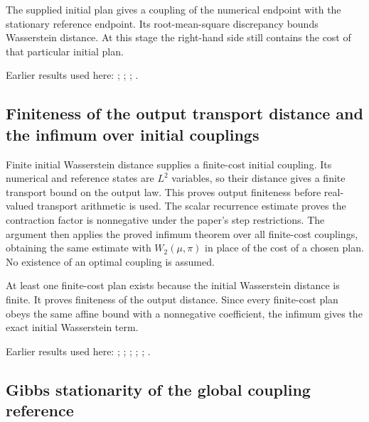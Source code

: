 \documentclass[11pt,a4paper]{report}
\begin{document}
The supplied initial plan gives a coupling of the numerical endpoint with the stationary reference endpoint. Its root-mean-square discrepancy bounds Wasserstein distance. At this stage the right-hand side still contains the cost of that particular initial plan.



Earlier results used here: \cite[Section~3.17.1]{LangevinLean2026ULASC}; \cite[Section~3.17.2]{LangevinLean2026ULASC}; \cite[Section~3.17.4]{LangevinLean2026ULASC}; \cite[Section~3.22.23]{LangevinLean2026ULASC}.
\subsection{\texorpdfstring{Finiteness of the output transport distance and the infimum over initial couplings}{Finiteness of the output transport distance and the infimum over initial couplings}}
\label{report-step-KineticLangevin-GenericCanonicalKLMC-lean-17}


Finite initial Wasserstein distance supplies a finite-cost initial coupling. Its numerical and reference states are \(L^{2}\) variables, so their distance gives a finite transport bound on the output law. This proves output finiteness before real-valued transport arithmetic is used. The scalar recurrence estimate proves the contraction factor is nonnegative under the paper's step restrictions. The argument then applies the proved infimum theorem over all finite-cost couplings, obtaining the same estimate with \(W_2(\mu,\pi)\) in place of the cost of a chosen plan. No existence of an optimal coupling is assumed.



At least one finite-cost plan exists because the initial Wasserstein distance is finite. It proves finiteness of the output distance. Since every finite-cost plan obeys the same affine bound with a nonnegative coefficient, the infimum gives the exact initial Wasserstein term.



Earlier results used here: \cite[Section~3.17.1]{LangevinLean2026ULASC}; \cite[Section~3.17.12]{LangevinLean2026ULASC}; \cite[Section~3.17.3]{LangevinLean2026ULASC}; \cite[Section~3.17.4]{LangevinLean2026ULASC}; \cite[Section~3.18.2]{LangevinLean2026ULASC}; \cite[Section~3.18.4]{LangevinLean2026ULASC}.
\subsection{\texorpdfstring{Gibbs stationarity of the global coupling reference}{Gibbs stationarity of the global coupling reference}}
\label{report-step-KineticLangevin-GenericCanonicalKLMC-lean-18}
\end{document}
